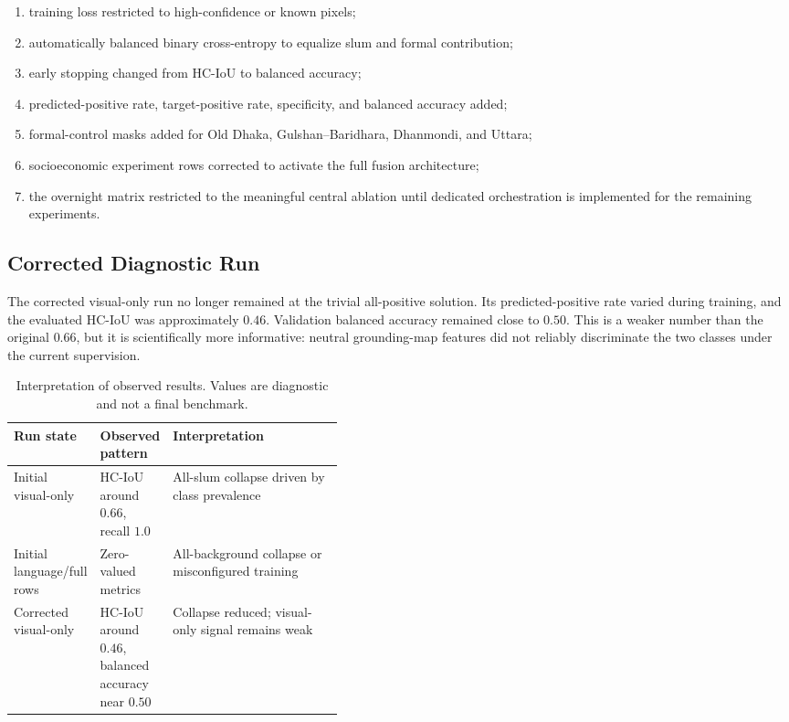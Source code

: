 \documentclass[11pt,a4paper]{article}
\begin{document}
\begin{enumerate}
    \item training loss restricted to high-confidence or known pixels;
    \item automatically balanced binary cross-entropy to equalize slum and formal contribution;
    \item early stopping changed from HC-IoU to balanced accuracy;
    \item predicted-positive rate, target-positive rate, specificity, and balanced accuracy added;
    \item formal-control masks added for Old Dhaka, Gulshan--Baridhara, Dhanmondi, and Uttara;
    \item socioeconomic experiment rows corrected to activate the full fusion architecture;
    \item the overnight matrix restricted to the meaningful central ablation until dedicated orchestration is implemented for the remaining experiments.
\end{enumerate}

\subsection{Corrected Diagnostic Run}

The corrected visual-only run no longer remained at the trivial all-positive solution. Its predicted-positive rate varied during training, and the evaluated HC-IoU was approximately \(0.46\). Validation balanced accuracy remained close to \(0.50\). This is a weaker number than the original \(0.66\), but it is scientifically more informative: neutral grounding-map features did not reliably discriminate the two classes under the current supervision.

\begin{table}[H]
\centering
\caption{Interpretation of observed results. Values are diagnostic and not a final benchmark.}
\begin{tabularx}{\linewidth}{p{0.24\linewidth}p{0.18\linewidth}Y}
\toprule
\textbf{Run state} & \textbf{Observed pattern} & \textbf{Interpretation}\\
\midrule
Initial visual-only & HC-IoU around \(0.66\), recall \(1.0\) & All-slum collapse driven by class prevalence\\
Initial language/full rows & Zero-valued metrics & All-background collapse or misconfigured training\\
Corrected visual-only & HC-IoU around \(0.46\), balanced accuracy near \(0.50\) & Collapse reduced; visual-only signal remains weak\\
\bottomrule
\end{tabularx}
\end{table}
\end{document}

